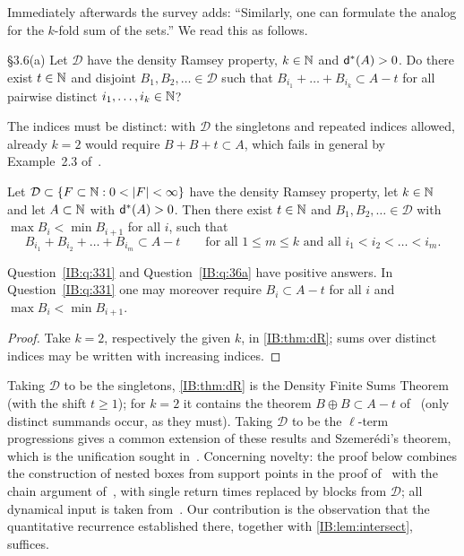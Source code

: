 Immediately afterwards the survey adds: ``Similarly, one can formulate the analog
for the $k$-fold sum of the sets.'' We read this as follows.

\begin{question}{\S3.6(a)}
\label{IB:q:36a}
Let $\mathcal D$ have the density Ramsey property, $k\in\mathbb{N}$ and $\mathsf{d}^*(A)>0$. Do there
exist $t\in\mathbb{N}$ and disjoint $B_1,B_2,\ldots\in\mathcal D$ such that
$B_{i_1}+\dots+B_{i_k}\subset A-t$ for all pairwise distinct
$i_1,\dots,i_k\in\mathbb{N}$?
\end{question}

The indices must be distinct: with $\mathcal D$ the singletons and repeated indices
allowed, already $k=2$ would require $B+B+t\subset A$, which fails in general by
Example~2.3 of~\cite{kra2023problems}.

\begin{theorem}
\label{IB:thm:dR}
Let $\mathcal D\subset\{F\subset\N: 0<|F|<\infty\}$ have the density Ramsey property,
let $k\in\mathbb{N}$ and let $A\subset\mathbb{N}$ with $\mathsf{d}^*(A)>0$. Then there exist $t\in\mathbb{N}$ and
$B_1,B_2,\ldots\in\mathcal D$ with $\max B_i<\min B_{i+1}$ for all $i$, such that
\[
B_{i_1}+B_{i_2}+\dots+B_{i_m}\subset A-t
\qquad\text{for all } 1\le m\le k \text{ and all } i_1<i_2<\dots<i_m .
\]
\end{theorem}

\begin{corollary}
\label{IB:cor:331}
Question~\ref{IB:q:331} and Question~\ref{IB:q:36a} have positive answers. In
Question~\ref{IB:q:331} one may moreover require $B_i\subset A-t$ for all $i$ and
$\max B_i<\min B_{i+1}$.
\end{corollary}

\begin{proof}
Take $k=2$, respectively the given $k$, in \cref{IB:thm:dR}; sums over distinct
indices may be written with increasing indices.
\end{proof}

\begin{remark}
\label{IB:rem:dR}
Taking $\mathcal D$ to be the singletons, \cref{IB:thm:dR} is the Density Finite
Sums Theorem~\cite[Theorem~1.1]{kra2025density} (with the shift $t\ge 1$); for
$k=2$ it contains the theorem $B\oplus B\subset A-t$ of~\cite{kra2022proof} (only distinct
summands occur, as they must). Taking $\mathcal D$ to be the $\ell$-term
progressions gives a common extension of these results and Szemer\'edi's theorem,
which is the unification sought in~\cite[\S3.6]{kra2023problems}. Concerning
novelty: the proof below combines the construction of nested boxes from support
points in the proof of~\cite[Proposition~3.2]{kra2025density} with the chain argument
of~\cite[Lemma~2.2]{kra2025density}, with single return times replaced by blocks
from $\mathcal D$; all
dynamical input is taken from~\cite{kra2025density}. Our contribution is the
observation that the quantitative recurrence established there, together with
\cref{IB:lem:intersect}, suffices.
\end{remark}

